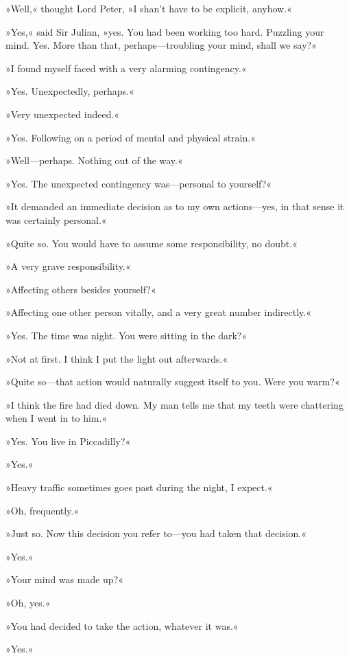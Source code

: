 »Well,« thought Lord Peter, »I shan't have to be explicit, anyhow.«

»Yes,« said Sir Julian, »yes. You had been working too hard. Puzzling your mind. Yes. More than that, perhaps\allowbreak---\allowbreak troubling your mind, shall we say?«

»I found myself faced with a very alarming contingency.«

»Yes. Unexpectedly, perhaps.«

»Very unexpected indeed.«

»Yes. Following on a period of mental and physical strain.«

»Well\allowbreak---\allowbreak perhaps. Nothing out of the way.«

»Yes. The unexpected contingency was\allowbreak---\allowbreak personal to yourself?«

»It demanded an immediate decision as to my own actions\allowbreak---\allowbreak yes, in that sense it was certainly personal.«

»Quite so. You would have to assume some responsibility, no doubt.«

»A very grave responsibility.«

»Affecting others besides yourself?«

»Affecting one other person vitally, and a very great number indirectly.«

»Yes. The time was night. You were sitting in the dark?«

»Not at first. I think I put the light out afterwards.«

»Quite so\allowbreak---\allowbreak that action would naturally suggest itself to you. Were you warm?«

»I think the fire had died down. My man tells me that my teeth were chattering when I went in to him.«

»Yes. You live in Piccadilly?«

»Yes.«

»Heavy traffic sometimes goes past during the night, I expect.«

»Oh, frequently.«

»Just so. Now this decision you refer to\allowbreak---\allowbreak you had taken that decision.«

»Yes.«

»Your mind was made up?«

»Oh, yes.«

»You had decided to take the action, whatever it was.«

»Yes.«

